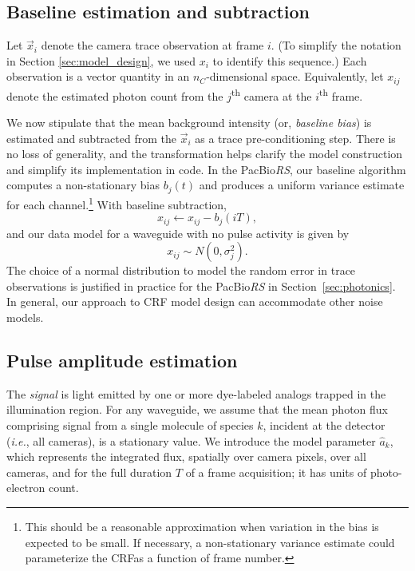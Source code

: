 \documentclass[10pt]{article}
\newcommand{\ie}{\emph{i.e.}}
\newcommand{\crf}{{\small CRF}}
\newcommand{\theRS}{the PacBio\hspace{2 pt}\textit{RS}}
\newcommand{\normdist}[2]{\ensuremath{N(#1, #2)}}
\begin{document}
\subsection{Baseline estimation and subtraction}
\label{sec:baselining}
Let $\vec{x}_i$ denote the camera trace observation at frame $i$.
(To simplify the notation in Section \ref{sec:model_design}, we used $x_i$ to identify this sequence.)
Each observation is a vector quantity in an $n_C$-dimensional space. 
Equivalently, let $x_{ij}$ denote the estimated photon count from the $j$\textsuperscript{th} camera at the $i$\textsuperscript{th} frame. 
 
We now stipulate that the mean background intensity (or, \emph{baseline bias}) is estimated and subtracted from the $\vec{x}_i$ as a trace pre-conditioning step.
There is no loss of generality, and the transformation helps clarify the model construction and simplify its implementation in code.
In \theRS, our baseline algorithm computes a non-stationary bias $b_j(t)$ and produces a uniform variance estimate for each channel.\footnote{
	This should be a reasonable approximation when variation in the bias is expected to be small.
	If necessary, a non-stationary variance estimate could parameterize the \crf as a function of frame number.}
With baseline subtraction,
\begin{equation}
\label{eq:baseline_subtraction}
x_{ij} \leftarrow x_{ij} - b_j(iT),
\end{equation}   
and our data model for a waveguide with no pulse activity is given by
\begin{equation}
x_{ij} \sim \normdist{0}{\sigma_j^2}.
\end{equation}
The choice of a normal distribution to model the random error in trace observations is justified in practice for \theRS{} in Section~\ref{sec:photonics}.  In general, our approach to \crf{} model design can accommodate other noise models.

\subsection{Pulse amplitude estimation}
\label{sec:amplitude_model}
The \emph{signal} is light emitted by one or more dye-labeled analogs trapped in the illumination region. 
For any waveguide, we assume that the mean photon flux comprising signal from a single molecule of species $k$, incident at the detector (\ie, all cameras), is a stationary value.
We introduce the model parameter $\hat{a}_k$, which represents the integrated flux, spatially over camera pixels, over all cameras, and for the full duration $T$ of a frame acquisition; it has units of photo-electron count.
\end{document}
